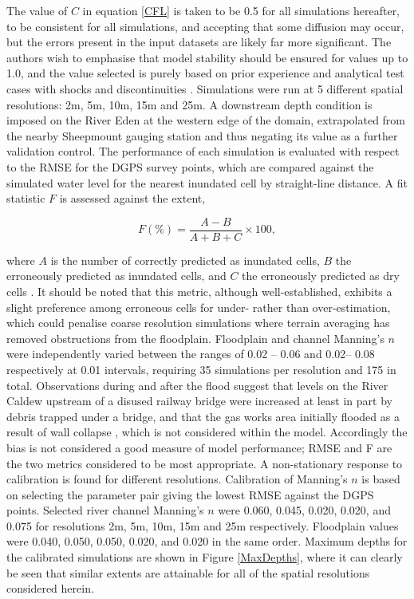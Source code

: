\documentclass[11pt,english,a4paper]{article}
\begin{document}
The value of \(C\) in equation \eqref{CFL} is taken to be 0.5 for all simulations hereafter, to be consistent for all simulations, and accepting that some diffusion may occur, but the errors present in the input datasets are likely far more significant. The authors wish to emphasise that model stability should be ensured for values up to 1.0, and the value selected is purely based on prior experience and analytical test cases with shocks and discontinuities \citep{Liang2009c}. Simulations were run at 5 different spatial resolutions: 2m, 5m, 10m, 15m and 25m. A downstream depth condition is imposed on the River Eden at the western edge of the domain, extrapolated from the nearby Sheepmount gauging station and thus negating its value as a further validation control. The performance of each simulation is evaluated with respect to the RMSE for the DGPS survey points, which are compared against the simulated water level for the nearest inundated cell by straight-line distance. A fit statistic \(F\) is assessed against the extent, 

\begin{equation}
	\label{FitStatistic}
	F (\%) = \frac{A - B}{A + B + C} \times 100,
\end{equation}

where \(A\) is the number of correctly predicted as inundated cells, \(B\) the erroneously predicted as inundated cells, and \(C\) the erroneously predicted as dry cells \citep[as in][]{Horritt2010}. It should be noted that this metric, although well-established, exhibits a slight preference among erroneous cells for under- rather than over-estimation, which could penalise coarse resolution simulations where terrain averaging has removed obstructions from the floodplain.
Floodplain and channel Manning's \(n\) were independently varied between the ranges of 0.02 -- 0.06 and 0.02-- 0.08 respectively at 0.01 intervals, requiring 35 simulations per resolution and 175 in total. Observations during and after the flood suggest that levels on the River Caldew upstream of a disused railway bridge were increased at least in part by debris trapped under a bridge, and that the gas works area initially flooded as a result of wall collapse \citep{EnvironmentAgency2006a,Fewtrell2011a}, which is not considered within the model. Accordingly the bias is not considered a good measure of model performance; RMSE and F are the two metrics considered to be most appropriate. A non-stationary response to calibration is found for different resolutions. Calibration of Manning's \(n\) is based on selecting the parameter pair giving the lowest RMSE against the DGPS points. Selected river channel Manning's \(n\) were 0.060, 0.045, 0.020, 0.020, and 0.075 for resolutions 2m, 5m, 10m, 15m and 25m respectively. Floodplain values were 0.040, 0.050, 0.050, 0.020, and 0.020 in the same order. Maximum depths for the calibrated simulations are shown in Figure \ref{MaxDepths}, where it can clearly be seen that similar extents are attainable for all of the spatial resolutions considered herein. 
\end{document}

